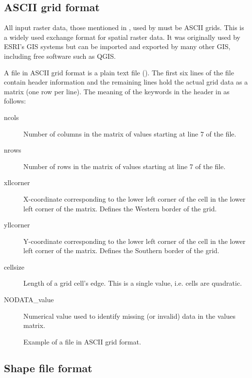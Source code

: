 \subsection{ASCII grid format} \label{sec:topocatch:formats-grid}

All input raster data, \eg{} those mentioned in , used by  must be ASCII grids. This is a widely used exchange format for spatial raster data. It was originally used by ESRI's GIS systems but can be imported and exported by many other GIS, including free software such as QGIS.

A file in ASCII grid format is a plain text file (). The first six lines of the file contain header information and the remaining lines hold the actual grid data as a matrix (one row per line). The meaning of the keywords in the header in as follows:

\begin{description}
  \item [ncols] Number of columns in the matrix of values starting at line 7 of the file.
  \item [nrows] Number of rows in the matrix of values starting at line 7 of the file.
  \item [xllcorner] X-coordinate corresponding to the lower left corner of the cell in the lower left corner of the matrix. Defines the Western border of the grid.
  \item [yllcorner] Y-coordinate corresponding to the lower left corner of the cell in the lower left corner of the matrix. Defines the Southern border of the grid.
  \item [cellsize] Length of a grid cell's edge. This is a single value, i.e.{} cells are quadratic.
  \item [NODATA\_value] Numerical value used to identify missing (or invalid) data in the values matrix.
\end{description}

\begin{figure}
  
  \caption{Example of a file in ASCII grid format. \label{fig:asciigrid}}
\end{figure}

\subsection{Shape file format} \label{sec:topocatch:formats-vector}

